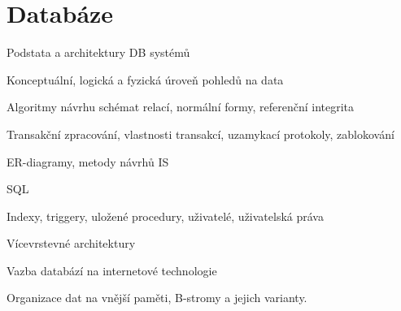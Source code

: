 \section{Databáze}
\begin{pozadavky}
\begin{pitemize}
\item Podstata a architektury DB systémů
\item Konceptuální, logická a fyzická úroveň pohledů na data
\item Algoritmy návrhu schémat relací, normální formy, referenční integrita
\item Transakční zpracování, vlastnosti transakcí, uzamykací protokoly, zablokování
\item ER-diagramy, metody návrhů IS
\item SQL
\item Indexy, triggery, uložené procedury, uživatelé, uživatelská práva
\item Vícevrstevné architektury
\item Vazba databází na internetové technologie
\item Organizace dat na vnější paměti, B-stromy a jejich varianty.
\end{pitemize}
\end{pozadavky}











